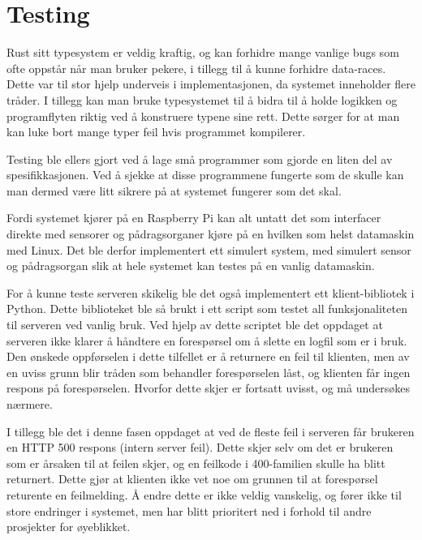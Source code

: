 \section{Testing}

Rust sitt typesystem er veldig kraftig, og kan forhidre mange vanlige bugs som ofte oppstår når man bruker pekere, i tillegg til å kunne forhidre data-races. Dette var til stor hjelp underveis i implementasjonen, da systemet inneholder flere tråder. I tillegg kan man bruke typesystemet til å bidra til å holde logikken og programflyten riktig ved å konstruere typene sine rett. Dette sørger for at man kan luke bort mange typer feil hvis programmet kompilerer. 

Testing ble ellers gjort ved å lage små programmer som gjorde en liten del av spesifikkasjonen. Ved å sjekke at disse programmene fungerte som de skulle kan man dermed være litt sikrere på at systemet fungerer som det skal.

Fordi systemet kjører på en Raspberry Pi kan alt untatt det som interfacer direkte med sensorer og pådragsorganer kjøre på en hvilken som helst datamaskin med Linux. Det ble derfor implementert ett simulert system, med simulert sensor og pådragsorgan slik at hele systemet kan testes på en vanlig datamaskin.

For å kunne teste serveren skikelig ble det også implementert ett klient-bibliotek i Python. Dette biblioteket ble så brukt i ett script som testet all funksjonaliteten til serveren ved vanlig bruk. Ved hjelp av dette scriptet ble det oppdaget at serveren ikke klarer å håndtere en forespørsel om å slette en logfil som er i bruk. Den ønskede oppførselen i dette tilfellet er å returnere en feil til klienten, men av en uviss grunn blir tråden som behandler forespørselen låst, og klienten får ingen respons på forespørselen. Hvorfor dette skjer er fortsatt uvisst, og må undersøkes nærmere.

I tillegg ble det i denne fasen oppdaget at ved de fleste feil i serveren får brukeren en HTTP 500 respons (intern server feil). Dette skjer selv om det er brukeren som er årsaken til at feilen skjer, og en feilkode i 400-familien skulle ha blitt returnert. Dette gjør at klienten ikke vet noe om grunnen til at forespørsel returente en feilmelding. Å endre dette er ikke veldig vanskelig, og fører ikke til store endringer i systemet, men har blitt prioritert ned i forhold til andre prosjekter for øyeblikket.